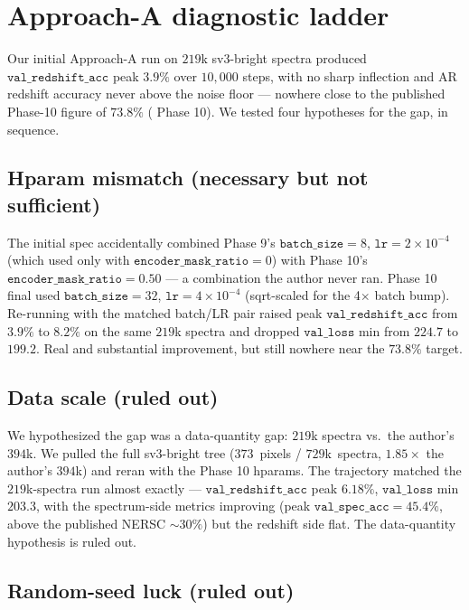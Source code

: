 \documentclass[11pt,letterpaper]{article}
\newcommand{\valloss}{\texttt{val\_loss}}
\newcommand{\valz}{\texttt{val\_redshift\_acc}}
\begin{document}
\section{Approach-A diagnostic ladder}

Our initial Approach-A run on $219$k sv3-bright spectra produced
$\valz$ peak $3.9\%$ over $10{,}000$ steps, with no sharp inflection
and AR redshift accuracy never above the noise floor --- nowhere
close to the published Phase-10 figure of $73.8\%$
(\citealt{samuel2026redshifty} Phase 10). We tested four hypotheses
for the gap, in sequence.

\subsection{Hparam mismatch (necessary but not sufficient)}

The initial spec accidentally combined Phase 9's
$\texttt{batch\_size}{=}8$, $\texttt{lr}{=}2{\times}10^{-4}$ (which
\citet{samuel2026redshifty} used only with
$\texttt{encoder\_mask\_ratio}{=}0$) with Phase 10's
$\texttt{encoder\_mask\_ratio}{=}0.50$ --- a combination the author
never ran. Phase 10 final used $\texttt{batch\_size}{=}32$,
$\texttt{lr}{=}4{\times}10^{-4}$ (sqrt-scaled for the 4$\times$ batch
bump). Re-running with the matched batch/LR pair raised peak $\valz$
from $3.9\%$ to $8.2\%$ on the same $219$k spectra and dropped
$\valloss$ min from $224.7$ to $199.2$. Real and substantial
improvement, but still nowhere near the $73.8\%$ target.

\subsection{Data scale (ruled out)}

We hypothesized the gap was a data-quantity gap: $219$k spectra vs.\
the author's $394$k. We pulled the full sv3-bright tree
($373$~pixels / $729$k~spectra, $1.85{\times}$ the author's
$394$k) and reran with the Phase 10 hparams. The trajectory matched
the $219$k-spectra run almost exactly --- $\valz$ peak $6.18\%$,
$\valloss$ min $203.3$, with the spectrum-side metrics improving
(peak $\texttt{val\_spec\_acc} = 45.4\%$, above the published NERSC
$\sim$$30\%$) but the redshift side flat. The data-quantity
hypothesis is ruled out.

\subsection{Random-seed luck (ruled out)}
\end{document}

